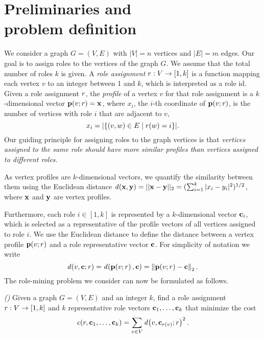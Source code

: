 \section{Preliminaries and\\problem definition}
\label{sec:prel}

We consider a graph $G = (V, E)$ 
with $|V|=n$ vertices and $|E|=m$ edges. 
Our goal is to assign roles to the vertices of the graph $G$.
We assume that the total number of roles $k$ is given.
A \emph{role assignment} 
${r}:{V} \to {[1, k]}$ is a function mapping each vertex $v$ to an integer between 1 and $k$, 
which is interpreted as a role id. 
Given a role assignment $r$, 
the \emph{profile} of a vertex $v$ for that role assignment 
is a $k$-dimensional vector $\prof{v; \role} = \vect{x}$, 
where $x_i$, the $i$-th coordinate of $\prof{v; \role}$, 
is the number of vertices with role $i$ that are adjacent to $v$,
\[
	x_i = {\left|\left\{(v, w) \in E \mid r(w) = i\right\}\right|}.
\]
Our guiding principle for assigning roles to the graph vertices is that
\emph{vertices assigned to the same role should have more similar
profiles than vertices assigned to different roles.}

As vertex profiles are $k$-dimensional vectors, 
we quantify the similarity between them using the Euclidean distance 
$\dist{\vect{x},\vect{y}} = || \vect{x}-\vect{y} ||_2 = 
(\sum_{i=1}^k |x_i-y_i|^2)^{1/2}$, 
where $\mathbf{x}$ and $\mathbf{y}$ are vertex profiles.

Furthermore, each role $i\in[1,k]$ is represented by a $k$-dimensional vector $\mathbf{c}_i$, 
which is selected as a representative of the profile vectors of all vertices assigned to role $i$.
We use the Euclidean distance to define the distance between 
a vertex profile $\prof{v; \role}$ 
and a role representative vector $\mathbf{c}$.
For simplicity of notation we write 
\[
\dist{v, \centroid; \role} = 
\dist{\prof{v; \role},\centroid} = 
\norm{\prof{v; \role} - \centroid}_2.
\]
The role-mining problem we consider
can now be formulated as follows.

\begin{problem}
\label{problem:role-mining}
\emph{(\prbrm)}
Given a graph $G = (V, E)$ and an integer $k$, 
find a role assignment ${r}:{V} \to {[1, k]}$ and 
$k$ representative role vectors $\mathbf{c}_1, \ldots, \mathbf{c}_k$
that minimize the cost
\[
\cost{\role, \centroid_1, \ldots, \centroid_k} = 
\sum_{v \in V} \dist{v, \centroid_{\role(v)}; \role}^2.
\]
\end{problem}

